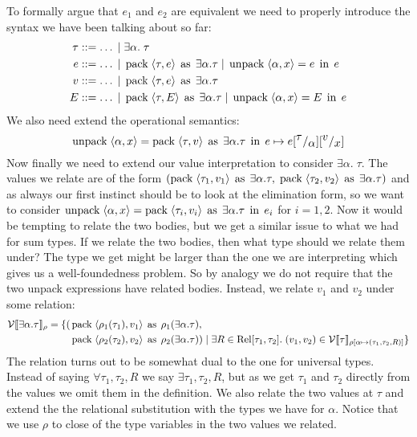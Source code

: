To formally argue that $e_1$ and $e_2$ are equivalent we need to properly introduce the syntax we have been talking about so far:
\begin{align*}
  \tau & ::= \dots \; | \; \exists \alpha. \; \tau \\
  e & ::= \dots \; | \; \operatorname{pack} \; \langle \tau,e \rangle \; \operatorname{as} \; \exists \alpha. \tau \; | \; \operatorname{unpack} \; \langle \alpha,x \rangle = e \; \operatorname{in} \; e  \\
  v & ::= \dots \; | \; \operatorname{pack} \; \langle \tau,e \rangle \; \operatorname{as} \; \exists \alpha. \tau \\
  E & ::= \dots \; | \; \operatorname{pack} \; \langle \tau,E \rangle \; \operatorname{as} \; \exists \alpha. \tau \; | \; \operatorname{unpack} \; \langle \alpha,x \rangle = E \; \operatorname{in} \; e 
\end{align*}
We also need extend the operational semantics:
\[
\operatorname{unpack} \; \langle \alpha,x \rangle = \operatorname{pack} \; \langle \tau,v \rangle \; \operatorname{as} \; \exists \alpha. \tau \; \operatorname{in} \; e  \mapsto e[^{\textstyle \tau}/_{\textstyle \alpha}][^{\textstyle v}/_{\textstyle x}]
\]
Now finally we need to extend our value interpretation to consider $\exists \alpha. \; \tau$. The values we relate are of the form $(\operatorname{pack} \; \langle \tau_1,v_1 \rangle \; \operatorname{as} \; \exists\alpha.\tau, \; \operatorname{pack} \; \langle \tau_2,v_2 \rangle \; \operatorname{as} \; \exists\alpha.\tau)$ and as always our first instinct should be to look at the elimination form, so we want to consider $\operatorname{unpack} \; \langle \alpha,x \rangle = \operatorname{pack} \; \langle \tau_i,v_i \rangle \; \operatorname{as} \; \exists\alpha.\tau \; \operatorname{in} \; e_i $ for $i=1,2$. Now it would be tempting to relate the two bodies, but we get a similar issue to what we had for sum types. If we relate the two bodies, then what type should we relate them under? The type we get might be larger than the one we are interpreting which gives us a well-foundedness problem. So by analogy we do not require that the two unpack expressions have related bodies. Instead, we relate $v_1$ and $v_2$ under some relation:
\begin{align*}
  \vprep{\exists\alpha.\tau} = \{(&\pack{\rho_1(\tau_1)}{v_1}{\rho_1(\exists\alpha.\tau)},\\
                                  &\pack{\rho_2(\tau_2)}{v_2}{\rho_2(\exists\alpha.\tau)}) \vbar \exists R \in \Rel[\tau_1,\tau_2].\; (v_1,v_2) \in \vprep[\extsub{\rho}{\alpha}{(\tau_1,\tau_2,R)}]{\tau}\} %
\end{align*}
The relation turns out to be somewhat dual to the one for universal types. Instead of saying $\forall \tau_1,\tau_2,R$ we say $\exists \tau_1,\tau_2,R$, but as we get $\tau_1$ and $\tau_2$ directly from the values we omit them in the definition. We also relate the two values at $\tau$ and extend the the relational substitution with the types we have for $\alpha$. Notice that we use $\rho$ to close of the type variables in the two values we related.

